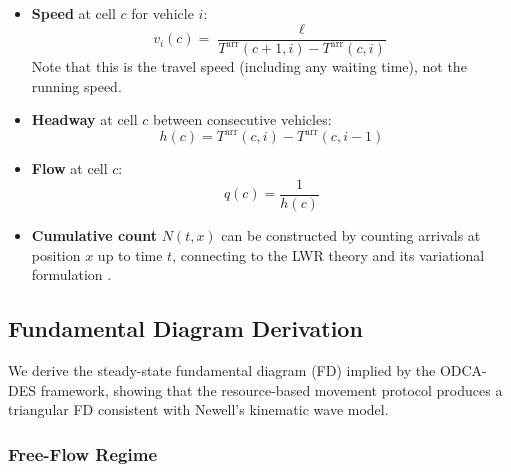 \documentclass[review,number]{elsarticle}
\newcommand{\Tarr}{T^{\text{arr}}}
\begin{document}
\begin{itemize}
    \item \textbf{Speed} at cell $c$ for vehicle $i$:
    \begin{equation}
        v_i(c) = \frac{\ell}{\Tarr(c+1, i) - \Tarr(c, i)}
        \label{eq:speed_from_T}
    \end{equation}
    Note that this is the travel speed (including any waiting time), not the running speed.

    \item \textbf{Headway} at cell $c$ between consecutive vehicles:
    \begin{equation}
        h(c) = \Tarr(c, i) - \Tarr(c, i-1)
        \label{eq:headway_from_T}
    \end{equation}

    \item \textbf{Flow} at cell $c$:
    \begin{equation}
        q(c) = \frac{1}{h(c)}
        \label{eq:flow_from_T}
    \end{equation}

    \item \textbf{Cumulative count} $N(t, x)$ can be constructed by counting arrivals at position $x$ up to time $t$, connecting to the LWR theory \citep{lighthill1955kinematic, richards1956shock} and its variational formulation \citep{daganzo2005variational}.
\end{itemize}

\subsection{Fundamental Diagram Derivation}
\label{sec:fd_derivation}

We derive the steady-state fundamental diagram (FD) implied by the ODCA-DES framework, showing that the resource-based movement protocol produces a triangular FD consistent with Newell's kinematic wave model.

\subsubsection{Free-Flow Regime}
\end{document}
